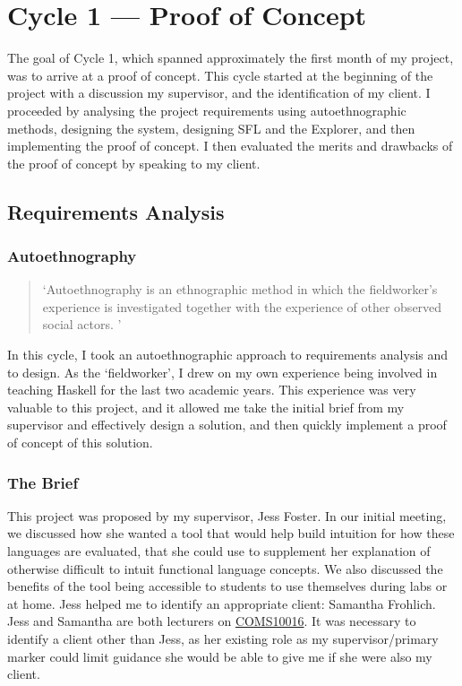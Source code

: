 \chapter{Cycle 1 --- Proof of Concept}
The goal of Cycle 1, which spanned approximately the first month of my project, was to arrive at a proof of concept. This cycle started at the beginning of the project with a discussion my supervisor, and the identification of my client. I proceeded by analysing the project requirements using autoethnographic methods, designing the system, designing \ac{SFL} and the Explorer, and then implementing the proof of concept. I then evaluated the merits and drawbacks of the proof of concept by speaking to my client. 

\section{Requirements Analysis}
\subsection{Autoethnography}
\label{sec:c1_autoethnography}
\begin{quote}
`Autoethnography is an ethnographic method in which the fieldworker's experience is investigated together with the experience of other observed social actors. \cite{autoethnography}'
\end{quote}

\noindent In this cycle, I took an autoethnographic approach to requirements analysis and to design. As the `fieldworker', I drew on my own experience being involved in teaching Haskell for the last two academic years. This experience was very valuable to this project, and it allowed me take the initial brief from my supervisor and effectively design a solution, and then quickly implement a proof of concept of this solution. 

\subsection{The Brief}
This project was proposed by my supervisor, Jess Foster. In our initial meeting, we discussed how she wanted a tool that would help build intuition for how these languages are evaluated, that she could use to supplement her explanation of otherwise difficult to intuit functional language concepts. We also discussed the benefits of the tool being accessible to students to use themselves during labs or at home. Jess helped me to identify an appropriate client: Samantha Frohlich. Jess and Samantha are both lecturers on \hyperref[COMS10016]{COMS10016}. It was necessary to identify a client other than Jess, as her existing role as my supervisor/primary marker could limit guidance she would be able to give me if she were also my client. 

